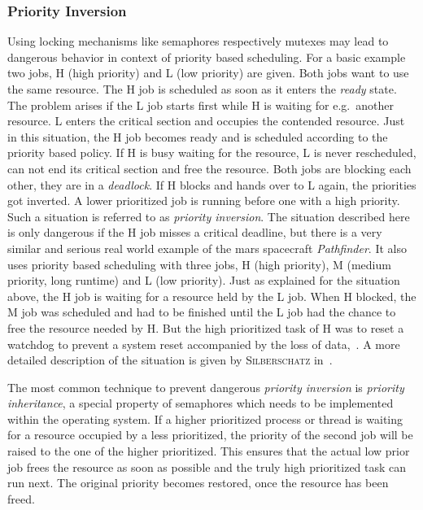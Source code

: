 \subsubsection*{Priority Inversion}\label{sec:priority-inversion}
Using locking mechanisms like semaphores respectively mutexes may lead to dangerous behavior in context of priority based scheduling.
For a basic example two jobs, H (high priority) and L (low priority) are given.
Both jobs want to use the same resource.
The H job is scheduled as soon as it enters the \textit{ready} state.
The problem arises if the L job starts first while H is waiting for e.g.\ another resource.
L enters the critical section and occupies the contended resource.
Just in this situation, the H job becomes ready and is scheduled according to the priority based policy.
If H is busy waiting for the resource, L is never rescheduled, can not end its critical section and free the resource\cite{tanenbaum-modern-operating-systems}.
Both jobs are blocking each other, they are in a \textit{deadlock}\cite{glatz2015betriebssysteme}.
If H blocks and hands over to L again, the priorities got inverted.
A lower prioritized job is running before one with a high priority.
Such a situation is referred to as \textit{priority inversion}\cite{tanenbaum-modern-operating-systems}.
The situation described here is only dangerous if the H job misses a critical deadline, but there is a very similar and serious real world example of the mars spacecraft \textit{Pathfinder}.
It also uses priority based scheduling with three jobs, H (high priority), M (medium priority, long runtime) and L (low priority).
Just as explained for the situation above, the H job is waiting for a resource held by the L job. 
When H blocked, the M job was scheduled and had to be finished until the L job had the chance to free the resource needed by H.
But the high prioritized task of H was to reset a watchdog to prevent a system reset accompanied by the loss of data\cite{glatz2015betriebssysteme},~\cite{silberschatz2009operating}.
A more detailed description of the situation is given by \textsc{Silberschatz} in~\cite{silberschatz2009operating}.

The most common technique to prevent dangerous \textit{priority inversion} is \textit{priority inheritance}, a special property of semaphores which needs to be implemented within the operating system.
If a higher prioritized process or thread is waiting for a resource occupied by a less prioritized, the priority of the second job will be raised to the one of the higher prioritized.
This ensures that the actual low prior job frees the resource as soon as possible and the truly high prioritized task can run next.
The original priority becomes restored, once the resource has been freed\cite{glatz2015betriebssysteme}.


